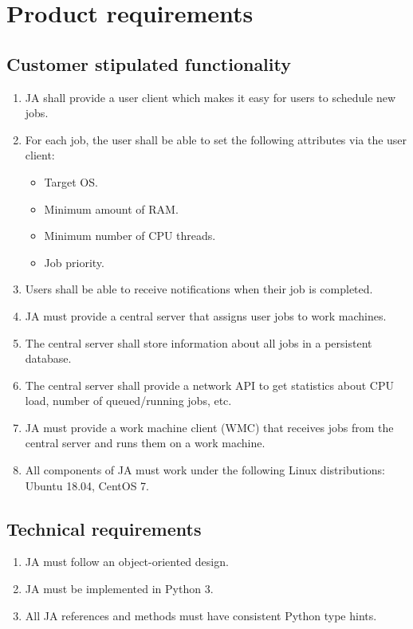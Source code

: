 \chapter{Product requirements}
\section{Customer stipulated functionality}
\begin{enumerate}
  \item JA shall provide a user client which makes it easy for users to schedule new jobs.
  \item For each job, the user shall be able to set the following attributes via the user client:
    \begin{itemize}
      \item Target OS.
      \item Minimum amount of RAM.
      \item Minimum number of CPU threads.
      \item Job priority.
    \end{itemize}
  \item Users shall be able to receive notifications when their job is completed.
  \item JA must provide a central server that assigns user jobs to work machines.
  \item The central server shall store information about all jobs in a persistent database.
  \item The central server shall provide a network API to get statistics about CPU load, number of queued/running jobs, etc.
  \item JA must provide a work machine client (WMC) that receives jobs from the central server and runs them on a work machine.
  \item All components of JA must work under the following Linux distributions: Ubuntu 18.04, CentOS 7.
\end{enumerate}
\section{Technical requirements}
\begin{enumerate}
  \item JA must follow an object-oriented design.
  \item JA must be implemented in Python 3.
  \item All JA references and methods must have consistent Python type hints.
\end{enumerate}
